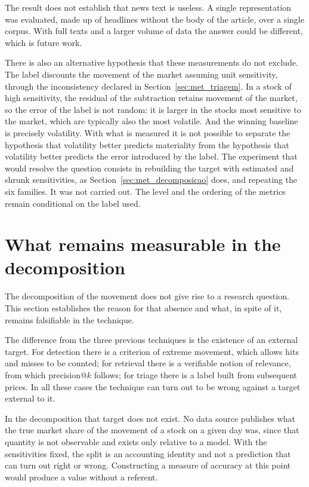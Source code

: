 The result does not establish that news text is useless. A single representation was evaluated,
made up of headlines without the body of the article, over a single corpus. With full texts and a
larger volume of data the answer could be different, which is future work.

There is also an alternative hypothesis that these measurements do not exclude. The label discounts
the movement of the market assuming unit sensitivity, through the inconsistency declared in
Section~\ref{sec:met_triagem}. In a stock of high sensitivity, the residual of the subtraction
retains movement of the market, so the error of the label is not random: it is larger in the stocks
most sensitive to the market, which are typically also the most volatile. And the winning baseline
is precisely volatility. With what is measured it is not possible to separate the hypothesis that
volatility better predicts materiality from the hypothesis that volatility better predicts the error
introduced by the label. The experiment that would resolve the question consists in rebuilding the
target with estimated and shrunk sensitivities, as Section~\ref{sec:met_decomposicao} does, and
repeating the six families. It was not carried out. The level and the ordering of the metrics remain
conditional on the label used.

\section{What remains measurable in the decomposition}
\label{sec:av_decomposicao}

The decomposition of the movement does not give rise to a research question. This section
establishes the reason for that absence and what, in spite of it, remains falsifiable in the
technique.

The difference from the three previous techniques is the existence of an external target. For
detection there is a criterion of extreme movement, which allows hits and misses to be counted; for
retrieval there is a verifiable notion of relevance, from which precision@$k$ follows; for triage
there is a label built from subsequent prices. In all these cases the technique can turn out to be
wrong against a target external to it.

In the decomposition that target does not exist. No data source publishes what the true market
share of the movement of a stock on a given day was, since that quantity is not observable and
exists only relative to a model. With the sensitivities fixed, the split is an accounting identity
and not a prediction that can turn out right or wrong. Constructing a measure of accuracy at this
point would produce a value without a referent.

